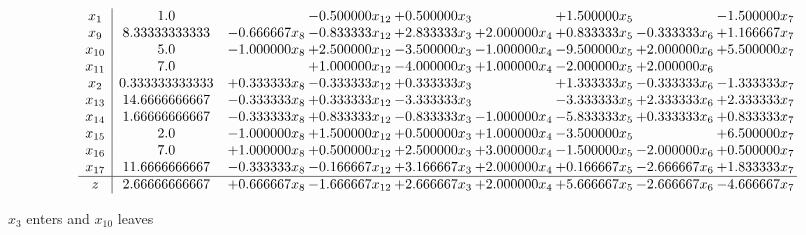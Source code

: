 \documentclass[10pt]{article}
\begin{document}
 \[\begin{array}{c| c c@{\hskip 2pt} c@{\hskip 2pt} c@{\hskip 2pt} c@{\hskip 2pt} c@{\hskip 2pt} c@{\hskip 2pt} c@{\hskip 2pt} }
 x_{1}   &  1.0  &   & -0.500000 x_{12} & + 0.500000 x_{3} &   & + 1.500000 x_{5} &   & -1.500000 x_{7}\\
 x_{9}   &  8.33333333333 & -0.666667 x_{8} & -0.833333 x_{12} & + 2.833333 x_{3} & + 2.000000 x_{4} & + 0.833333 x_{5} & -0.333333 x_{6} & + 1.166667 x_{7}\\
 x_{10}   &  5.0 & -1.000000 x_{8} & + 2.500000 x_{12} & -3.500000 x_{3} & -1.000000 x_{4} & -9.500000 x_{5} & + 2.000000 x_{6} & + 5.500000 x_{7}\\
 x_{11}   &  7.0  &   & + 1.000000 x_{12} & -4.000000 x_{3} & + 1.000000 x_{4} & -2.000000 x_{5} & + 2.000000 x_{6} &   \\
 x_{2}   &  0.333333333333 & + 0.333333 x_{8} & -0.333333 x_{12} & + 0.333333 x_{3} &   & + 1.333333 x_{5} & -0.333333 x_{6} & -1.333333 x_{7}\\
 x_{13}   &  14.6666666667 & -0.333333 x_{8} & + 0.333333 x_{12} & -3.333333 x_{3} &   & -3.333333 x_{5} & + 2.333333 x_{6} & + 2.333333 x_{7}\\
 x_{14}   &  1.66666666667 & -0.333333 x_{8} & + 0.833333 x_{12} & -0.833333 x_{3} & -1.000000 x_{4} & -5.833333 x_{5} & + 0.333333 x_{6} & + 0.833333 x_{7}\\
 x_{15}   &  2.0 & -1.000000 x_{8} & + 1.500000 x_{12} & + 0.500000 x_{3} & + 1.000000 x_{4} & -3.500000 x_{5} &   & + 6.500000 x_{7}\\
 x_{16}   &  7.0 & + 1.000000 x_{8} & + 0.500000 x_{12} & + 2.500000 x_{3} & + 3.000000 x_{4} & -1.500000 x_{5} & -2.000000 x_{6} & + 0.500000 x_{7}\\
 x_{17}   &  11.6666666667 & -0.333333 x_{8} & -0.166667 x_{12} & + 3.166667 x_{3} & + 2.000000 x_{4} & + 0.166667 x_{5} & -2.666667 x_{6} & + 1.833333 x_{7}\\
\hline
z    &  2.66666666667 & + 0.666667 x_{8} & -1.666667 x_{12} & + 2.666667 x_{3} & + 2.000000 x_{4} & + 5.666667 x_{5} & -2.666667 x_{6} & -4.666667 x_{7}\\
\end{array}\]


 $ x_{3} $ enters and $ x_{10} $ leaves 
\end{document}
